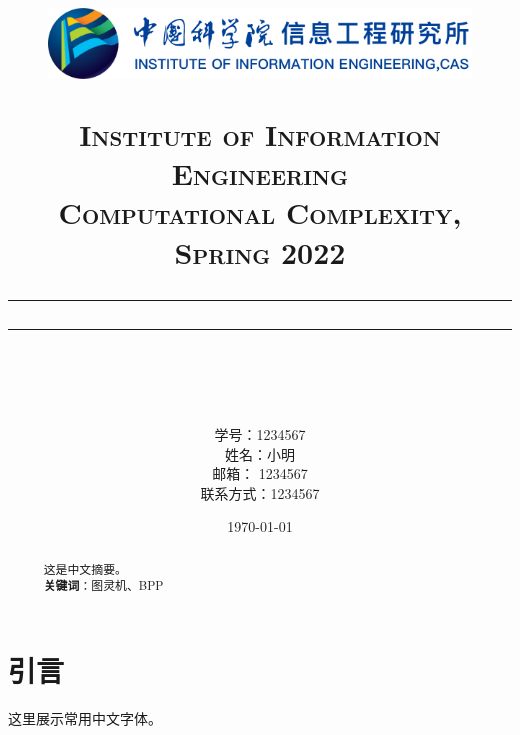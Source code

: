 \documentclass[a4paper, 12pt]{article}
\newcommand{\horrule}[1]{\rule[0.5ex]{\linewidth}{#1}} 	%
\begin{document}
\title{
    {
    \begin{figure}[htbp]
        \centering %
        \includegraphics[width = 0.7 \textwidth]{xgs_logo.png}
    \end{figure}
    }
    {
        \normalfont\normalsize\textsc{
            Institute of Information Engineering \\
            Computational Complexity, Spring 2022 \\
            [25pt]
        }
    }
    \horrule{0.5pt}
    \horrule{1.8pt} \\ [20pt]
}
\author{
    学号：1234567 \\ 
    姓名：小明 \\
    邮箱： 1234567 \\
    联系方式：1234567 \\ [60pt]
}
\date{\today}

\begin{titlepage}
    \maketitle
    \vspace{30pt}
    \thispagestyle{empty} %
\end{titlepage}

\begin{abstract}
        \normalsize \ \ 这是中文摘要。 \\[5pt]
        \indent \ \ \textbf{关键词}：图灵机、BPP
\end{abstract}
\thispagestyle{empty} %
\newpage

\tableofcontents
\newpage
{}

\section{引言}
这里展示常用中文字体。
\end{document}
